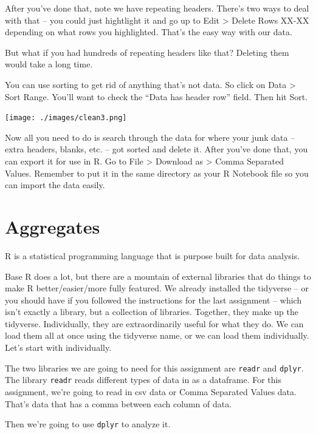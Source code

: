 \documentclass[
  letterpaper,
  DIV=11,
  numbers=noendperiod]{scrreprt}
\begin{document}
After you've done that, note we have repeating headers. There's two ways
to deal with that -- you could just hightlight it and go up to Edit
\textgreater{} Delete Rows XX-XX depending on what rows you highlighted.
That's the easy way with our data.

But what if you had hundreds of repeating headers like that? Deleting
them would take a long time.

You can use sorting to get rid of anything that's not data. So click on
Data \textgreater{} Sort Range. You'll want to check the ``Data has
header row'' field. Then hit Sort.

\texttt{[image: ./images/clean3.png]}

Now all you need to do is search through the data for where your junk
data -- extra headers, blanks, etc. -- got sorted and delete it. After
you've done that, you can export it for use in R. Go to File
\textgreater{} Download as \textgreater{} Comma Separated Values.
Remember to put it in the same directory as your R Notebook file so you
can import the data easily.


\hypertarget{aggregates}{%
\chapter{Aggregates}\label{aggregates}}

R is a statistical programming language that is purpose built for data
analysis.

Base R does a lot, but there are a mountain of external libraries that
do things to make R better/easier/more fully featured. We already
installed the tidyverse -- or you should have if you followed the
instructions for the last assignment -- which isn't exactly a library,
but a collection of libraries. Together, they make up the tidyverse.
Individually, they are extraordinarily useful for what they do. We can
load them all at once using the tidyverse name, or we can load them
individually. Let's start with individually.

The two libraries we are going to need for this assignment are
\texttt{readr} and \texttt{dplyr}. The library \texttt{readr} reads
different types of data in as a dataframe. For this assignment, we're
going to read in csv data or Comma Separated Values data. That's data
that has a comma between each column of data.

Then we're going to use \texttt{dplyr} to analyze it.
\end{document}
